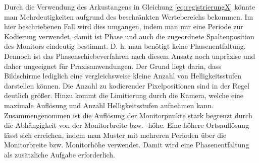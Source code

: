 \p
Durch die Verwendung des Arkustangens in Gleichung \ref{eq:registrierungX} könnte man Mehrdeutigkeiten aufgrund des beschränkten Wertebereichs bekommen.
Im hier beschriebenen Fall wird dies umgangen, indem man nur eine Periode zur Kodierung verwendet, damit ist Phase und auch die zugeordnete Spaltenposition des Monitors eindeutig bestimmt.
D. h. man benötigt keine Phasenentfaltung.
Dennoch ist das Phasenschiebeverfahren nach diesem Ansatz noch unpräzise und daher ungeeignet für Praxisanwendungen.
Der Grund liegt darin, dass Bildschirme lediglich eine vergleichsweise kleine Anzahl von Helligkeitsstufen darstellen können.
Die Anzahl zu kodierender Pixelpositionen sind in der Regel deutlich größer.
Hinzu kommt die Limitierung durch die Kamera, welche eine maximale Auflösung und Anzahl Helligkeitsstufen aufnehmen kann.
Zusammengenommen ist die Auflösung der Monitorpunkte stark begrenzt durch die Abhängigkeit von der Monitorbreite bzw. -höhe.
Eine höhere Ortsauflösung lässt sich erreichen, indem man Muster mit mehreren Perioden über die Monitorbreite bzw. Monitorhöhe verwendet.
Damit wird eine Phasenentfaltung als zusätzliche Aufgabe erforderlich.